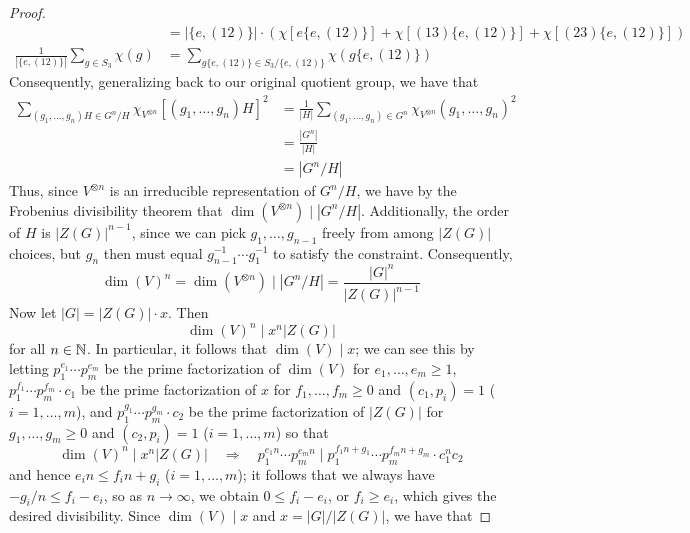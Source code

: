 \documentclass[../psets.tex]{subfiles}
\begin{document}
\begin{enumerate}
\begin{proof}
\begin{align*}
            &= |\{e,(12)\}|\cdot(\chi[e\{e,(12)\}]+\chi[(13)\{e,(12)\}]+\chi[(23)\{e,(12)\}])\\
            \frac{1}{|\{e,(12)\}|}\sum_{g\in S_3}\chi(g) &= \sum_{g\{e,(12)\}\in S_3/\{e,(12)\}}\chi(g\{e,(12)\})
        \end{align*}
        Consequently, generalizing back to our original quotient group, we have that
        \begin{align*}
            \sum_{(g_1,\dots,g_n)H\in G^n/H}\chi_{V^{\otimes n}}[(g_1,\dots,g_n)H]^2 &= \frac{1}{|H|}\sum_{(g_1,\dots,g_n)\in G^n}\chi_{V^{\otimes n}}(g_1,\dots,g_n)^2\\
            &= \frac{|G^n|}{|H|}\\
            &= |G^n/H|
        \end{align*}
        Thus, since $V^{\otimes n}$ is an irreducible representation of $G^n/H$, we have by the Frobenius divisibility theorem that $\dim(V^{\otimes n})\mid|G^n/H|$. Additionally, the order of $H$ is $|Z(G)|^{n-1}$, since we can pick $g_1,\dots,g_{n-1}$ freely from among $|Z(G)|$ choices, but $g_n$ then must equal $g_{n-1}^{-1}\cdots g_1^{-1}$ to satisfy the constraint. Consequently,
        \begin{equation*}
            \dim(V)^n = \dim(V^{\otimes n}) \mid |G^n/H| = \frac{|G|^n}{|Z(G)|^{n-1}}
        \end{equation*}
        Now let $|G|=|Z(G)|\cdot x$. Then
        \begin{equation*}
            \dim(V)^n \mid x^n|Z(G)|
        \end{equation*}
        for all $n\in\mathbb{N}$. In particular, it follows that $\dim(V)\mid x$; we can see this by letting $p_1^{e_1}\cdots p_m^{e_m}$ be the prime factorization of $\dim(V)$ for $e_1,\dots,e_m\geq 1$, $p_1^{f_1}\cdots p_m^{f_m}\cdot c_1$ be the prime factorization of $x$ for $f_1,\dots,f_m\geq 0$ and $(c_1,p_i)=1$ ($i=1,\dots,m$), and $p_1^{g_1}\cdots p_m^{g_m}\cdot c_2$ be the prime factorization of $|Z(G)|$ for $g_1,\dots,g_m\geq 0$ and $(c_2,p_i)=1$ ($i=1,\dots,m$) so that
        \begin{equation*}
            \dim(V)^n \mid x^n|Z(G)|
            \quad\Longrightarrow\quad
            p_1^{e_1n}\cdots p_m^{e_mn} \mid p_1^{f_1n+g_1}\cdots p_m^{f_mn+g_m}\cdot c_1^nc_2
        \end{equation*}
        and hence $e_in\leq f_in+g_i$ ($i=1,\dots,m$); it follows that we always have $-g_i/n\leq f_i-e_i$, so as $n\to\infty$, we obtain $0\leq f_i-e_i$, or $f_i\geq e_i$, which gives the desired divisibility. Since $\dim(V)\mid x$ and $x=|G|/|Z(G)|$, we have that

\end{proof}
\end{enumerate}
\end{document}
